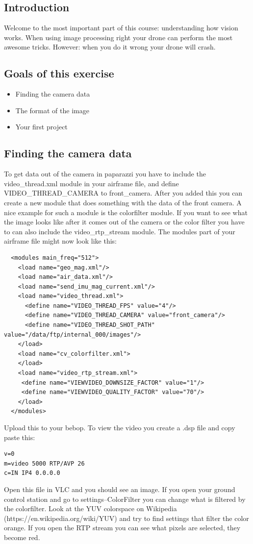 \documentclass{article}
\begin{document}

\subsection*{Introduction}
Welcome to the most important part of this course: understanding how vision works. When using image processing right your drone can perform the most awesome tricks. However: when you do it wrong your drone will crash. 

\subsection*{Goals of this exercise}
\begin{itemize}
\item Finding the camera data
\item The format of the image
\item Your first project
\end{itemize}

\subsection*{Finding the camera data}
To get data out of the camera in paparazzi you have to include the video\_thread.xml module in your airframe file, and define VIDEO\_THREAD\_CAMERA to front\_camera. After you added this you can create a new module that does something with the data of the front camera. A nice example for such a module is the colorfilter module.
If you want to see what the image looks like after it comes out of the camera or the color filter you have to can also include the video\_rtp\_stream  module. 
The modules part of your airframe file might now look like this:
\begin{verbatim}
  <modules main_freq="512">
    <load name="geo_mag.xml"/>
    <load name="air_data.xml"/>
    <load name="send_imu_mag_current.xml"/>
    <load name="video_thread.xml">
      <define name="VIDEO_THREAD_FPS" value="4"/>
      <define name="VIDEO_THREAD_CAMERA" value="front_camera"/>
      <define name="VIDEO_THREAD_SHOT_PATH" value="/data/ftp/internal_000/images"/>
    </load>
    <load name="cv_colorfilter.xml">
    </load>
    <load name="video_rtp_stream.xml">
     <define name="VIEWVIDEO_DOWNSIZE_FACTOR" value="1"/>
     <define name="VIEWVIDEO_QUALITY_FACTOR" value="70"/>
    </load>
  </modules>
\end{verbatim}
Upload this to your bebop. To view the video you create a .dsp file and copy paste this:
\begin{verbatim}
v=0
m=video 5000 RTP/AVP 26
c=IN IP4 0.0.0.0
\end{verbatim}
Open this file in VLC and you should see an image. 
If you open your ground control station and go to settings--ColorFilter you can change what is filtered by the colorfilter. Look at the YUV colorspace on Wikipedia (https://en.wikipedia.org/wiki/YUV) and try to find settings that filter the color orange. If you open the RTP stream you can see what pixels are selected, they become red. 
\end{document}
